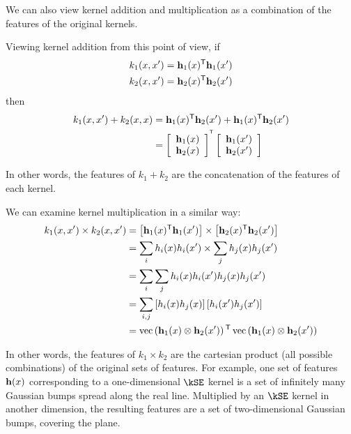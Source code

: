 We can also view kernel addition and multiplication as a combination of the features of the original kernels.

Viewing kernel addition from this point of view, if
%
\begin{align}
k_1(x, x') & = {\bf{h}}_1(x){^\mathsf{T}} {\bf{h}}_1(x')\\
k_2(x, x') & = {\bf{h}}_2(x){^\mathsf{T}} {\bf{h}}_2(x')
\end{align}
%
then
%
\begin{align}
k_1(x, x') + k_2(x, x)
& = {\bf{h}}_1(x){^\mathsf{T}} {\bf{h}}_2(x') + {\bf{h}}_1(x){^\mathsf{T}} {\bf{h}}_2(x') \\
& = \left[ \begin{array}{c} {{\bf{h}}_1(x)} \\ {{\bf{h}}_2(x)} \end{array} \right]^{^\mathsf{T}} \left[ \begin{array}{c} {{\bf{h}}_1(x')} \\ {{\bf{h}}_2(x')} \end{array} \right]
\end{align}

In other words, the features of $k_1 + k_2$ are the concatenation of the features of each kernel.

We can examine kernel multiplication in a similar way:
%
\begin{align}
k_1(x, x') \times k_2(x, x')
& = \left[ {\bf{h}}_1(x){^\mathsf{T}} {\bf{h}}_1(x') \right] \times \left[ {\bf{h}}_2(x){^\mathsf{T}} {\bf{h}}_2(x') \right] \\
& = \sum_i h_i(x) h_i(x') \times \sum_j h_j(x) h_j(x') \\
& = \sum_i \sum_j h_i(x) h_i(x') h_j(x) h_j(x') \\
& = \sum_{i,j} \left[ h_i(x) h_j(x) \right] \left[ h_i(x') h_j(x') \right] \\
& = \operatorname{vec} \left( { {\bf{h}}_1(x) \otimes {\bf{h}}_2(x') } \right) {^\mathsf{T}} \operatorname{vec} \left( { {\bf{h}}_1(x) \otimes {\bf{h}}_2(x')} \right) 
\end{align}

In other words, the features of $k_1 \times k_2$ are the cartesian product (all possible combinations) of the original sets of features.
For example, one set of features ${\bf{h}}(x)$ corresponding to a one-dimensional $\kSE$ kernel is a set of infinitely many Gaussian bumps spread along the real line.
Multiplied by an $\kSE$ kernel in another dimension, the resulting features are a set of two-dimensional Gaussian bumps, covering the plane.


